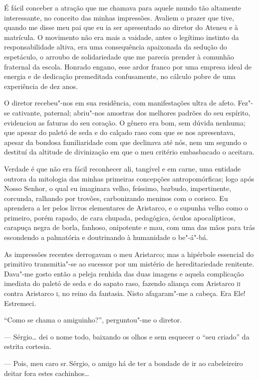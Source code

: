 É fácil conceber a atração que me chamava para aquele mundo
tão altamente interessante, no conceito das minhas impressões. Avaliem
o prazer que tive, quando me disse meu pai que eu ia ser apresentado ao
diretor do Ateneu e à matrícula. O movimento não era mais a vaidade,
antes o legítimo instinto da responsabilidade altiva, era uma
consequência apaixonada da sedução do espetáculo, o arroubo de
solidariedade que me parecia prender à comunhão fraternal da escola.
Honrado engano, esse ardor franco por uma empresa ideal de energia e de
dedicação premeditada confusamente, no cálculo pobre de uma experiência
de dez anos. 

O diretor recebeu"-nos em sua residência, com
manifestações ultra de afeto. Fez"-se cativante, paternal; abriu"-nos
amostras dos melhores padrões do seu espírito, evidenciou as faturas do
seu coração. O gênero era bom, sem dúvida nenhuma; que apesar do paletó
de seda e do calçado raso com que se nos apresentava, apesar da bondosa
familiaridade com que declinava até nós, nem um segundo o destituí da
altitude de divinização em que o meu critério embasbacado o aceitara.

Verdade é que não era fácil reconhecer ali, tangível e em carne, uma
entidade outrora da mitologia das minhas primeiras concepções
antropomórficas; logo após Nosso Senhor, o qual eu imaginara velho,
feíssimo, barbudo, impertinente, corcunda, ralhando por trovões,
carbonizando meninos com o corisco. Eu aprendera a ler pelos livros
elementares de Aristarco, e o supunha velho como o primeiro, porém
rapado, de cara chupada, pedagógica, óculos apocalípticos, carapuça
negra de borla, fanhoso, onipotente e mau, com uma das mãos para trás
escondendo a palmatória e doutrinando à humanidade o be"-á"-bá. 

As impressões recentes derrogavam o meu Aristarco; mas a hipérbole
essencial do primitivo transmitia"-se ao sucessor por um mistério de
hereditariedade renitente. Dava"-me gosto então a peleja renhida das
duas imagens e aquela complicação imediata do paletó de seda e do
sapato raso, fazendo aliança com Aristarco \textsc{ii} contra Aristarco \textsc{i}, no
reino da fantasia. Nisto afagaram"-me a cabeça. Era Ele! Estremeci.

``Como se chama o amiguinho?'', perguntou"-me o diretor. 

--- Sérgio\ldots{} dei o nome todo, baixando os olhos e sem esquecer o ``seu criado'' da
estrita cortesia. 

--- Pois, meu caro sr.\,Sérgio, o amigo há de ter a
bondade de ir ao cabeleireiro deitar fora estes cachinhos\ldots{} 

